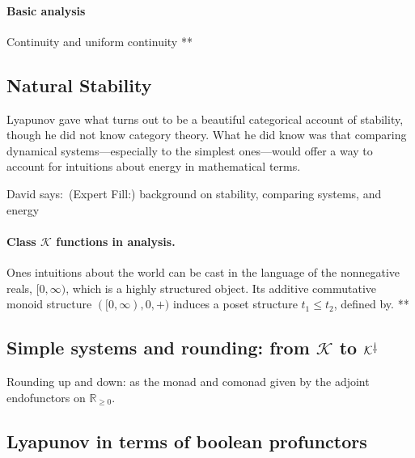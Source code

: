 \documentclass[11pt, one side, article]{memoir}
\theoremstyle{definition}
\theoremstyle{plain}
\newcommand{\cat}[1]{\mathcal{#1}}%
\newcommand{\ldag}{^{\rotatebox{180}{$\dagger$}}}
\newcommand{\rr}{\mathbb{R}}
\newcommand{\dnote}[1]{{\color{blue}David says:}~#1\quad{\color{blue}$\lozenge$}}
\newcommand{\ivlnon}{[0,\infty)}
\newcommand{\rrnon}{\rr_{\geq0}}
\newcommand{\K}{\cat{K}}
\newcommand{\Kdag}[1][0]{\K\ldag}
\begin{document}
\paragraph{Basic analysis}

Continuity and uniform continuity **

\subsection{Natural Stability}

Lyapunov gave what turns out to be a beautiful categorical account of stability, though he did not know category theory. What he did know was that comparing dynamical systems---especially to the simplest ones---would offer a way to account for intuitions about energy in mathematical terms.

\dnote{(Expert Fill:) background on stability, comparing systems, and energy}


\paragraph{Class $\K$ functions in analysis.}

Ones intuitions about the world can be cast in the language of the nonnegative reals, $\ivlnon$, which is a highly structured object. Its additive commutative monoid structure $(\ivlnon,0,+)$ induces a poset structure $t_1\leq t_2$, defined by. **

\subsection{Simple systems and rounding: from $\K$ to $\Kdag$}

Rounding up and down: as the monad and comonad given by the adjoint endofunctors on $\rrnon$.

\subsection{Lyapunov in terms of boolean profunctors}
\end{document}

